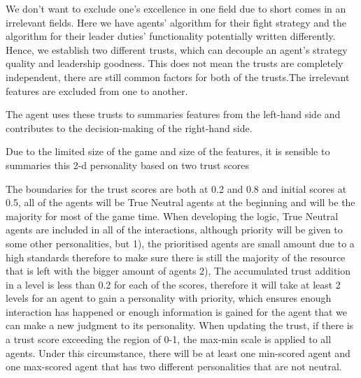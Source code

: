 We don’t want to exclude one’s excellence in one field due to short comes in an irrelevant fields.
Here we have agents’ algorithm for their fight strategy and the algorithm for their leader duties’ functionality potentially written differently. 
Hence, we establish two different trusts, which can decouple an agent’s strategy quality and leadership goodness. This does not mean the trusts are completely independent, there are still common factors for both of the trusts.The irrelevant features are excluded from one to another.

The agent uses these trusts to summaries features from the left-hand side and contributes to the decision-making of the right-hand side. 

Due to the limited size of the game and size of the features, it is sensible to summaries this 2-d personality based on two trust scores

The boundaries for the trust scores are both at 0.2 and 0.8 and initial scores at 0.5, all of the agents will be True Neutral agents at the beginning and will be the majority for most of the game time. When developing the logic, True Neutral agents are included in all of the interactions, although priority will be given to some other personalities, but 1), the prioritised agents are small amount due to a high standards therefore to make sure there is still the majority of the resource that is left with the bigger amount of agents 2), The accumulated trust addition in a level is less than 0.2 for each of the scores, therefore it will take at least 2 levels for an agent to gain a personality with priority, which ensures enough interaction has happened or enough information is gained for the agent that we can make a new judgment to its personality. When updating the trust, if there is a trust score exceeding the region of 0-1, the max-min scale is applied to all agents. Under this circumstance, there will be at least one min-scored agent and one max-scored agent that has two different personalities that are not neutral. 

\newpage

